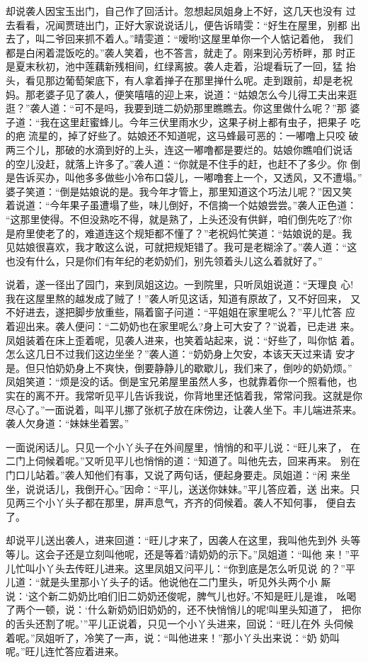 却说袭人因宝玉出门，自己作了回活计。忽想起凤姐身上不好，这几天也没有
过去看看，况闻贾琏出门，正好大家说说话儿，便告诉晴雯：“好生在屋里，别都
出去了，叫二爷回来抓不着人。”晴雯道：“嗳哟!这屋里单你一个人惦记着他，
我们都是白闲着混饭吃的。”袭人笑着，也不答言，就走了。刚来到沁芳桥畔，那
时正是夏末秋初，池中莲藕新残相间，红绿离披。袭人走着，沿堤看玩了一回，猛
抬头，看见那边葡萄架底下，有人拿着掸子在那里掸什么呢。走到跟前，却是老祝
妈。那老婆子见了袭人，便笑嘻嘻的迎上来，说道：“姑娘怎么今儿得工夫出来逛
逛？”袭人道：“可不是吗，我要到琏二奶奶那里瞧瞧去。你这里做什么呢？”那
婆子道：“我在这里赶蜜蜂儿。今年三伏里雨水少，这果子树上都有虫子，把果子
吃的疤流星的，掉了好些了。姑娘还不知道呢，这马蜂最可恶的：一嘟噜上只咬
破两三个儿，那破的水滴到好的上头，连这一嘟噜都是要烂的。姑娘你瞧咱们说话
的空儿没赶，就落上许多了。”袭人道：“你就是不住手的赶，也赶不了多少。你
倒是告诉买办，叫他多多做些小冷布口袋儿，一嘟噜套上一个，又透风，又不遭塌。”
婆子笑道：“倒是姑娘说的是。我今年才管上，那里知道这个巧法儿呢？”因又笑
着说道：“今年果子虽遭塌了些，味儿倒好，不信摘一个姑娘尝尝。”袭人正色道：
“这那里使得。不但没熟吃不得，就是熟了，上头还没有供鲜，咱们倒先吃了?你
是府里使老了的，难道连这个规矩都不懂了？”老祝妈忙笑道：“姑娘说的是。我
见姑娘很喜欢，我才敢这么说，可就把规矩错了。我可是老糊涂了。”袭人道：“这
也没有什么，只是你们有年纪的老奶奶们，别先领着头儿这么着就好了。”

说着，遂一径出了园门，来到凤姐这边。一到院里，只听凤姐说道：“天理良
心!我在这屋里熬的越发成了贼了！”袭人听见这话，知道有原故了，又不好回来，
又不好进去，遂把脚步放重些，隔着窗子问道：“平姐姐在家里呢么？”平儿忙答
应着迎出来。袭人便问：“二奶奶也在家里呢么?身上可大安了？”说着，已走进
来。凤姐装着在床上歪着呢，见袭人进来，也笑着站起来，说：“好些了，叫你惦
着。怎么这几日不过我们这边坐坐？”袭人道：“奶奶身上欠安，本该天天过来请
安才是。但只怕奶奶身上不爽快，倒要静静儿的歇歇儿，我们来了，倒吵的奶奶烦。”
凤姐笑道：“烦是没的话。倒是宝兄弟屋里虽然人多，也就靠着你一个照看他，也
实在的离不开。我常听见平儿告诉我说，你背地里还惦着我，常常问我。这就是你
尽心了。”一面说着，叫平儿挪了张杌子放在床傍边，让袭人坐下。丰儿端进茶来。
袭人欠身道：“妹妹坐着罢。”

一面说闲话儿。只见一个小丫头子在外间屋里，悄悄的和平儿说：“旺儿来了，
在二门上伺候着呢。”又听见平儿也悄悄的道：“知道了。叫他先去，回来再来。
别在门口儿站着。”袭人知他们有事，又说了两句话，便起身要走。凤姐道：“闲
来坐坐，说说话儿，我倒开心。”因命：“平儿，送送你妹妹。”平儿答应着，送
出来。只见两三个小丫头子都在那里，屏声息气，齐齐的伺候着。袭人不知何事，
便自去了。

却说平儿送出袭人，进来回道：“旺儿才来了，因袭人在这里，我叫他先到外
头等等儿。这会子还是立刻叫他呢，还是等着?请奶奶的示下。”凤姐道：“叫他
来！”平儿忙叫小丫头去传旺儿进来。这里凤姐又问平儿：“你到底是怎么听见说
的？”平儿道：“就是头里那小丫头子的话。他说他在二门里头，听见外头两个小
厮说：‘这个新二奶奶比咱们旧二奶奶还俊呢，脾气儿也好。’不知是旺儿是谁，
吆喝了两个一顿，说：‘什么新奶奶旧奶奶的，还不快悄悄儿的呢!叫里头知道了，
把你的舌头还割了呢。’”平儿正说着，只见一个小丫头进来，回说：“旺儿在外
头伺候着呢。”凤姐听了，冷笑了一声，说：“叫他进来！”那小丫头出来说：“奶
奶叫呢。”旺儿连忙答应着进来。

